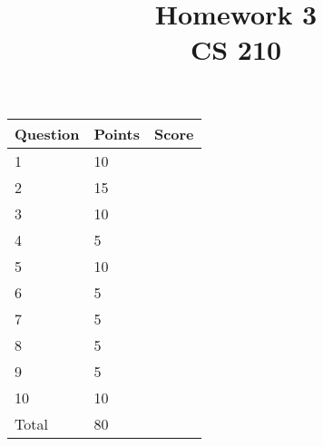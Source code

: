 \documentclass{article}
\title{Homework 3\\CS 210}
\date{}
\begin{document}
\maketitle
\vspace{-.5in}

\begin{center}
\begin{tabular}{|l|l|p{.4in}|}
\hline Question & Points & Score \\
\hline  1 & 10 & \\
\hline  2 & 15 & \\
\hline  3 & 10 & \\
\hline  4 &  5 & \\
\hline  5 & 10 & \\
\hline  6 &  5 & \\
\hline  7 &  5 & \\
\hline  8 &  5 & \\
\hline  9 &  5 & \\
\hline 10 & 10 & \\
\hline Total & 80 & \\
\hline 
\end{tabular}
\end{center}
\end{document}
